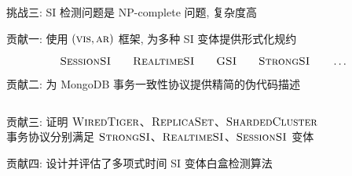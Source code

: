 \begin{frame}{}
  \begin{center}
	挑战三: SI 检测问题是 \textsf{NP-complete} 问题, 复杂度高

	\vspace{0.60cm}
  \end{center}
\end{frame}

\begin{frame}{}
  \begin{center}
    贡献一: 使用 $(\textsc{vis}, \textsc{ar})$ 框架, 为多种 SI 变体提供形式化规约

    \[
      \textsc{SessionSI} \qquad \textsc{RealtimeSI} \qquad \textsc{GSI} \qquad \textsc{StrongSI} \qquad \dots
    \]
  \end{center}
\end{frame}

\begin{frame}{}
  \begin{center}
	贡献二: 为 MongoDB 事务一致性协议提供精简的伪代码描述
  \end{center}

  \vspace{0.50cm}
  \begin{columns}
  \end{columns}
\end{frame}

\begin{frame}{}
  \begin{center}
    贡献三: 证明 $\textsc{WiredTiger}$、$\textsc{ReplicaSet}$、$\textsc{ShardedCluster}$ \\[5pt]
    事务协议分别满足 $\textsc{StrongSI}$、$\textsc{RealtimeSI}$、$\textsc{SessionSI}$ 变体
  \end{center}

\end{frame}

\begin{frame}{}
  \begin{center}
	贡献四: 设计并评估了多项式时间 SI 变体白盒检测算法
  \end{center}

\end{frame}
